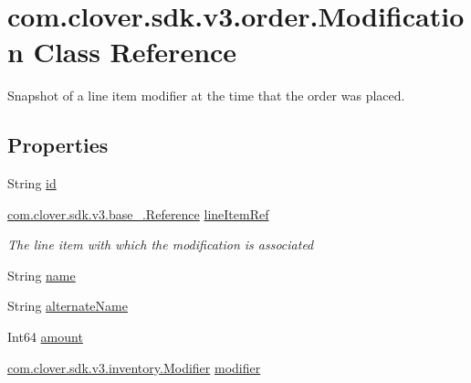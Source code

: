 \hypertarget{classcom_1_1clover_1_1sdk_1_1v3_1_1order_1_1_modification}{}\section{com.\+clover.\+sdk.\+v3.\+order.\+Modification Class Reference}
\label{classcom_1_1clover_1_1sdk_1_1v3_1_1order_1_1_modification}


Snapshot of a line item modifier at the time that the order was placed.  


\subsection*{Properties}
\begin{DoxyCompactItemize}
\item 
String \hyperlink{classcom_1_1clover_1_1sdk_1_1v3_1_1order_1_1_modification_a3dc32c042258d72f7cc06b64edfa5f36}{id}
\item 
\hyperlink{classcom_1_1clover_1_1sdk_1_1v3_1_1base___1_1_reference}{com.\+clover.\+sdk.\+v3.\+base\+\_\+.\+Reference} \hyperlink{classcom_1_1clover_1_1sdk_1_1v3_1_1order_1_1_modification_ae10602350c922aa9befc99465fe86a3f}{line\+Item\+Ref}
\begin{DoxyCompactList}\small\item\em The line item with which the modification is associated \end{DoxyCompactList}\item 
String \hyperlink{classcom_1_1clover_1_1sdk_1_1v3_1_1order_1_1_modification_a84546632f263029c7a5619695654f077}{name}
\item 
String \hyperlink{classcom_1_1clover_1_1sdk_1_1v3_1_1order_1_1_modification_abbb9955f6f35a2a051afdd5a124553dc}{alternate\+Name}
\item 
Int64 \hyperlink{classcom_1_1clover_1_1sdk_1_1v3_1_1order_1_1_modification_ac845d0ac88478caf23e4c19bcdec2a43}{amount}
\item 
\hyperlink{classcom_1_1clover_1_1sdk_1_1v3_1_1inventory_1_1_modifier}{com.\+clover.\+sdk.\+v3.\+inventory.\+Modifier} \hyperlink{classcom_1_1clover_1_1sdk_1_1v3_1_1order_1_1_modification_a56419d1dc4c9a9c813a1d5a2bc86e9c8}{modifier}

\end{DoxyCompactItemize}
